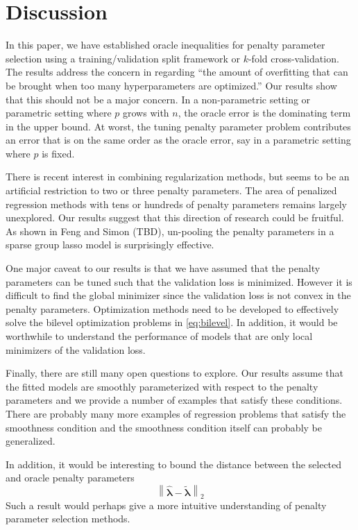 \documentclass[12pt]{article}
\begin{document}
\section{Discussion}\label{sec:discussion}

In this paper, we have established oracle inequalities for penalty parameter selection using a training/validation split framework or $k$-fold cross-validation. The results address the concern in \citet{bengio2000gradient} regarding ``the amount of overfitting that can be brought when too many hyperparameters are optimized.'' Our results show that 
this should not be a major concern. In a non-parametric setting or parametric setting where $p$ grows with $n$, the oracle error is the dominating term in the upper bound. At worst, the tuning penalty parameter problem contributes an error that is on the same order as the oracle error, say in a parametric setting where $p$ is fixed. 

There is recent interest in combining regularization methods, but seems to be an artificial restriction to two or three penalty parameters. The area of penalized regression methods with tens or hundreds of penalty parameters remains largely unexplored. Our results suggest that this direction of research could be fruitful. As shown in Feng and Simon (TBD), un-pooling the penalty parameters in a sparse group lasso model is surprisingly effective.

One major caveat to our results is that we have assumed that the penalty parameters can be tuned such that the validation loss is minimized. However it is difficult to find the global minimizer since the validation loss is not convex in the penalty parameters. Optimization methods need to be developed to effectively solve the bilevel optimization problems in \eqref{eq:bilevel}. In addition, it would be worthwhile to understand the performance of models that are only local minimizers of the validation loss.

Finally, there are still many open questions to explore. Our results assume that the fitted models are smoothly parameterized with respect to the penalty parameters and we provide a number of examples that satisfy these conditions. There are probably many more examples of regression problems that satisfy the smoothness condition and the smoothness condition itself can probably be generalized.

In addition, it would be interesting to bound the distance between the selected and oracle penalty parameters
\begin{equation}
\label{penalty_diff}
\left \| \hat{\boldsymbol \lambda} - \tilde{\boldsymbol \lambda} \right \|_2
\end{equation}
Such a result would perhaps give a more intuitive understanding of penalty parameter selection methods.
\end{document}
